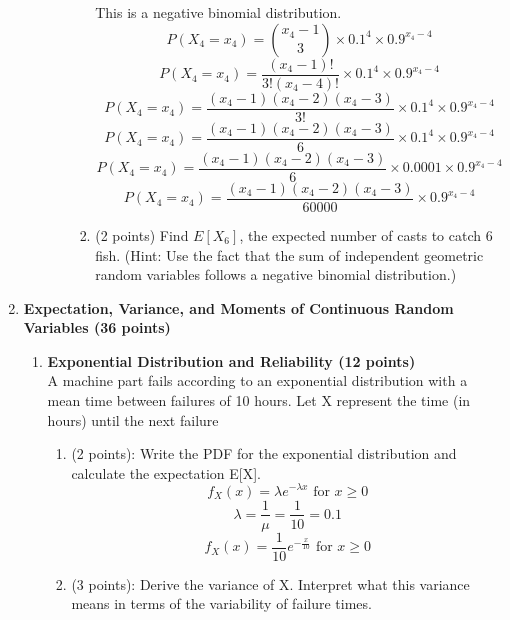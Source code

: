 \documentclass[a3paper,12pt]{article} %
\begin{document}
\begin{enumerate}
\begin{enumerate}
\begin{enumerate}
\begin{enumerate}
                This is a negative binomial distribution.
                \[
                    P(X_4 = x_4) = \binom{x_4 - 1}{3} \times 0.1^4 \times 0.9^{x_4 - 4}
                \]
                \[
                    P(X_4 = x_4) = \frac{(x_4 - 1)!}{3!(x_4 - 4)!} \times 0.1^4 \times 0.9^{x_4 - 4}
                \]
                \[
                    P(X_4 = x_4) = \frac{(x_4 - 1)(x_4 - 2)(x_4 - 3)}{3!} \times 0.1^4 \times 0.9^{x_4 - 4}
                \]
                \[
                    P(X_4 = x_4) = \frac{(x_4 - 1)(x_4 - 2)(x_4 - 3)}{6} \times 0.1^4 \times 0.9^{x_4 - 4}
                \]
                \[
                    P(X_4 = x_4) = \frac{(x_4 - 1)(x_4 - 2)(x_4 - 3)}{6} \times 0.0001 \times 0.9^{x_4 - 4}
                \]
                \[
                    P(X_4 = x_4) = \frac{(x_4 - 1)(x_4 - 2)(x_4 - 3)}{60000} \times 0.9^{x_4 - 4}
                \]
            \item (2 points) Find \(E[X_6]\), the expected number of casts to catch 6 fish. (Hint: Use the
            fact that the sum of independent geometric random variables follows a negative binomial
            distribution.)
            \end{enumerate}
        \end{enumerate}
    \end{enumerate}
    \newpage
    \item \textbf{Expectation, Variance, and Moments of Continuous Random Variables (36 points)}
    \begin{enumerate}
        \item \textbf{Exponential Distribution and Reliability (12 points)}
        \\ A machine part fails according to an exponential distribution with a mean time between failures of 10 hours. Let X represent the time (in hours) until the next failure
        \begin{enumerate}
            \item (2 points): Write the PDF for the exponential distribution and calculate the expectation E[X].
            \[
                f_X(x) = \lambda e^{-\lambda x} \text{ for } x \geq 0
            \]
            \[
                \lambda = \frac{1}{\mu} = \frac{1}{10} = 0.1
            \]
            \[
                f_X(x) = \frac{1}{10} e^{-\frac{x}{10}} \text{ for } x \geq 0   
            \]
            \item (3 points): Derive the variance of X. Interpret what this variance means in terms of the variability  of failure times.

\end{enumerate}
\end{enumerate}
\end{enumerate}
\end{document}
